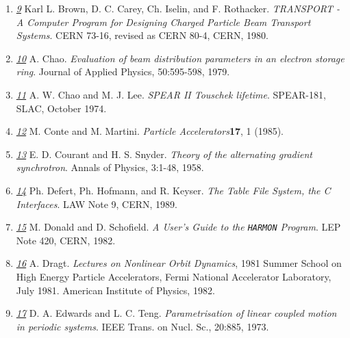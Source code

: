 \begin{enumerate}
	\item \href{transport}{\textit{9}} Karl L. Brown, D. C. Carey,
          Ch. Iselin, and F. Rothacker. \textit{TRANSPORT - A Computer
            Program for Designing Charged   Particle Beam Transport
            Systems}. CERN 73-16, revised as CERN 80-4, CERN, 1980.
    \label{bib:transport} 

	\item \href{chao}{\textit{10}} A. Chao. \textit{Evaluation of
          beam distribution parameters in an electron   storage
          ring}. Journal of Applied Physics, 50:595-598, 1979. 
	\label{bib:chao}

	\item \href{chao1}{\textit{11}} A. W. Chao and
          M. J. Lee. \textit{SPEAR II Touschek lifetime}. SPEAR-181,
          SLAC, October 1974. 

	\item \href{conte}{\textit{12}} M. Conte and
          M. Martini. \textit{Particle Accelerators}\textbf{17}, 1
          (1985). 
	\label{bib:conte}
		  
	\item \href{courant}{\textit{13}} E. D. Courant and
          H. S. Snyder. \textit{Theory of the alternating gradient
            synchrotron}. Annals of Physics, 3:1-48, 1958. 
	\label{bib:courant}

	\item \href{tfs}{\textit{14}} Ph. Defert, Ph. Hofmann, and
          R. Keyser. \textit{The Table File System, the C
            Interfaces}. LAW Note 9, CERN, 1989. 
	\label{bib:tfs}

	\item \href{donald}{\textit{15}} M. Donald and
          D. Schofield. \textit{A User's Guide to the \texttt{HARMON}
            Program}. LEP Note 420, CERN, 1982. 

	\item \href{dragt}{\textit{16}} A. Dragt. \textit{Lectures on
          Nonlinear Orbit Dynamics}, 1981 Summer School on High   Energy
          Particle Accelerators, Fermi National Accelerator Laboratory,
          July   1981. American Institute of Physics, 1982. 
	\label{bib:dragt}

	\item \href{edwards}{\textit{17}} D. A. Edwards and
          L. C. Teng. \textit{Parametrisation of linear coupled motion
            in periodic systems}. IEEE Trans. on Nucl. Sc., 20:885,
          1973. 
	\label{bib:edwards}


\end{enumerate}
